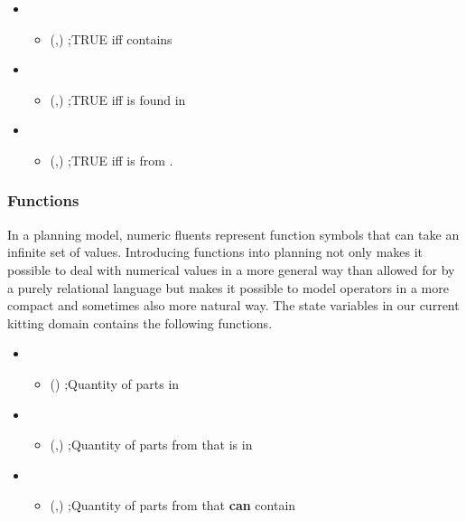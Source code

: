 \begin{itemize}
\item {}
  \begin{itemize}
    \item {}(,) ;TRUE iff  contains 
  \end{itemize}

\item {}
  \begin{itemize}
    \item {}(,) ;TRUE iff  is found in 
  \end{itemize}

\item {}
  \begin{itemize}
    \item {}(,) ;TRUE iff  is from .
  \end{itemize}
\end{itemize}

\subsubsection{Functions}
In a planning model, numeric fluents represent function symbols that can take an infinite
set of values. Introducing functions into planning not only makes it possible to deal with numerical
values in a more general way than allowed for by a purely relational language but makes it possible to model operators in a more compact and sometimes also more natural way. The state variables in our current kitting domain contains the following functions.

\begin{itemize}
 \item {}
  \begin{itemize}
   \item {}() ;Quantity of parts in 
  \end{itemize}

 \item {}
  \begin{itemize}
   \item {}(,) ;Quantity of parts from  that is in 
  \end{itemize}

     \item {}
  \begin{itemize}
  \item {}(,) ;Quantity of parts from  that  \textbf{can} contain
  \end{itemize}
\end{itemize}


